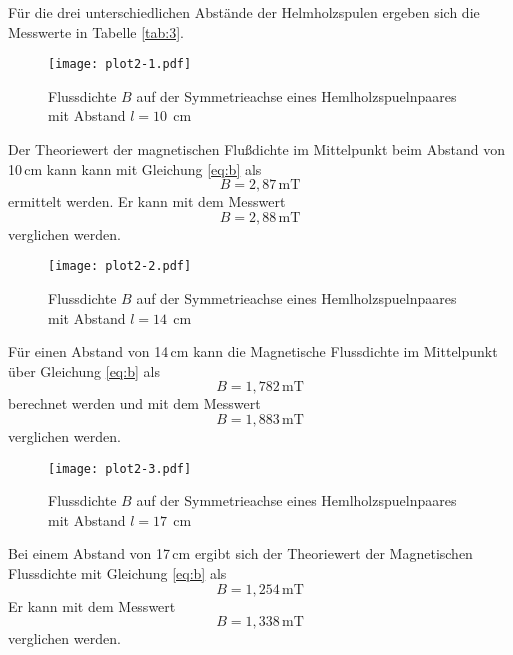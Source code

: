 Für die drei unterschiedlichen Abstände der Helmholzspulen
ergeben sich die Messwerte in Tabelle \ref{tab:3}. 
\begin{figure}[H]
\centering

  \texttt{[image: plot2-1.pdf]}
  \caption{Flussdichte $B$ auf der Symmetrieachse eines Hemlholzspuelnpaares mit Abstand $l=10\:\:\si{\centi\meter}$}
\end{figure}
\noindent Der Theoriewert der magnetischen Flußdichte im Mittelpunkt
beim Abstand von 10\,cm kann kann mit Gleichung \ref{eq:b}
als
  \begin{equation}
    B=2,87\,\si{\milli\tesla}\nonumber
  \end{equation}
\noindent ermittelt werden. Er kann mit dem Messwert 
\begin{equation}
    B=2,88\,\si{\milli\tesla}\nonumber
  \end{equation}
\noindent verglichen werden. 
\begin{figure}[H]
\centering
  \texttt{[image: plot2-2.pdf]}
    \caption{Flussdichte $B$ auf der Symmetrieachse eines Hemlholzspuelnpaares mit Abstand $l=14\:\:\si{\centi\meter}$}

\end{figure}
\noindent Für einen Abstand von 14\,cm kann die Magnetische
Flussdichte im Mittelpunkt über Gleichung \ref{eq:b}
als
  \begin{equation}
    B=1,782\,\si{\milli\tesla}\nonumber
  \end{equation}
\noindent berechnet werden und mit dem Messwert  
\begin{equation}
    B= 1,883\,\si{\milli\tesla}\nonumber
  \end{equation}
\noindent verglichen werden. 
\begin{figure}[H]
\centering
  \texttt{[image: plot2-3.pdf]}
    \caption{Flussdichte $B$ auf der Symmetrieachse eines Hemlholzspuelnpaares mit Abstand $l=17\:\:\si{\centi\meter}$}
\end{figure}
\noindent Bei einem Abstand von 17\,cm ergibt sich
der Theoriewert der Magnetischen Flussdichte mit
Gleichung \ref{eq:b} als
  \begin{equation}
    B=1,254\,\si{\milli\tesla}\nonumber
  \end{equation}
\noindent Er kann mit dem Messwert 
\begin{equation}
    B=1,338\,\si{\milli\tesla}\nonumber
  \end{equation}
\noindent verglichen werden. 

